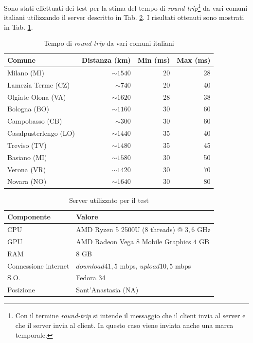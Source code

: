 Sono stati effettuati dei test per la stima del tempo di \textit{round-trip}\footnote{Con il termine \textit{round-trip} si intende il messaggio che il client invia al server e che il server invia al client. In questo caso viene inviata anche una marca temporale.} da vari comuni italiani utilizzando il server descritto in Tab. \ref{table:ServerUsato}. I risultati ottenuti sono mostrati in Tab. \ref{table:PingPong}.

\begin{table}[H]
	\centering
	\begin{tabular}{||l r r r||}
		\hline
		Comune & Distanza (km) & Min (ms) & Max (ms) \\
		\hline\hline
		\hline		
		Milano (MI) & $\sim1540$ & 20 & 28 \\
		\hline
		Lamezia Terme (CZ) & $\sim740$ & 20 & 40 \\		
		\hline
		Olgiate Olona (VA) & $\sim1620$ & 28 & 38 \\
		\hline
		Bologna (BO) & $\sim1160$ & 30 & 60 \\
		\hline
		Campobasso (CB) & $\sim300$ & 30 & 60 \\
		\hline
		Casalpusterlengo (LO) & $\sim1440$ & 35 & 40 \\		
		\hline
		Treviso (TV) & $\sim1480$ & 35 & 45 \\
		\hline		
		Basiano (MI) & $\sim1580$ & 30 & 50 \\
		\hline
		Verona (VR) & $\sim1420$ & 30 & 70 \\		
		\hline
		Novara (NO) & $\sim1640$ & 30 & 80 \\
		\hline
	\end{tabular}

	\caption{Tempo di \textit{round-trip} da vari comuni italiani}
	\label{table:PingPong}
\end{table}

\begin{table}[H]
	\centering
	\begin{tabular}{||l l||}
		\hline
		Componente & Valore \\
		\hline\hline
		\hline
		CPU & AMD Ryzen 5 2500U (8 threads) @ $3,6$ GHz \\
		\hline
		GPU & AMD Radeon Vega 8 Mobile Graphics $4$ GB \\
		\hline
		RAM & 8 GB \\
		\hline
		Connessione internet & $download 41,5$ mbps, $upload 10,5$ mbps \\
		\hline
		S.O. & Fedora 34 \\
		\hline
		Posizione & Sant'Anastasia (NA) \\
		\hline
	\end{tabular}

	\caption{Server utilizzato per il test}
	\label{table:ServerUsato}
\end{table}

